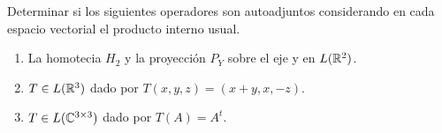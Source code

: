 \item Determinar si los siguientes operadores son autoadjuntos considerando en cada espacio vectorial el producto interno usual.
    \begin{enumerate}
        \item La homotecia $H_2$ y la proyección $P_Y$ sobre el eje y en $L(\mathbb{R}^2)$.
            \begin{mdframed}[style=s]
                
            \end{mdframed}
        \item $T\in L(\mathbb{R}^3)$ dado por $T(x,y,z)=(x+y,x,-z)$.
            \begin{mdframed}[style=s]
                
            \end{mdframed}
        \item $T\in L(\mathbb{C}^{3\times3})$ dado por $T(A)=A^t$.
            \begin{mdframed}[style=s]
                
            \end{mdframed}
    \end{enumerate}